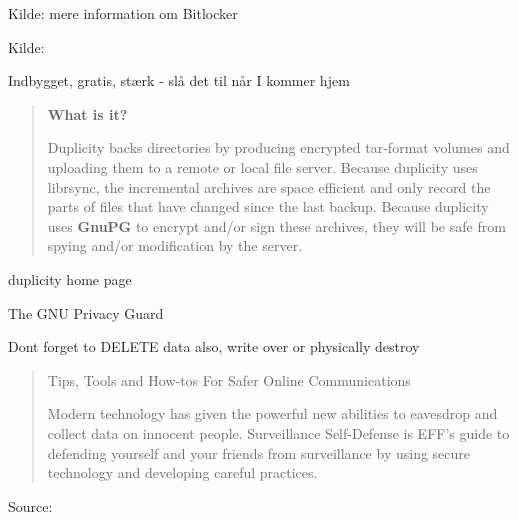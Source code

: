 \documentclass[18pt,landscape,a4paper,footrule]{foils}
\begin{document}
Kilde: mere information om Bitlocker\\
{\footnotesize {}}




Kilde: {\small
{}}



\centerline{Indbygget, gratis, stærk - slå det til når I kommer hjem}



\begin{quote}
{\large\bf What is it?}

Duplicity backs directories by producing encrypted tar-format volumes and uploading them to a remote or local file server. Because duplicity uses librsync, the incremental archives are space efficient and only record the parts of files that have changed since the last backup. Because duplicity uses {\bf GnuPG} to encrypt and/or sign these archives, they will be safe from spying and/or modification by the server.
\end{quote}

 duplicity home page

 The GNU Privacy Guard

\vskip 2cm
\centerline{Dont forget to DELETE data also, write over or physically destroy}



\begin{quote}
\centerline{Tips, Tools and How-tos For Safer Online Communications}

Modern technology has given the powerful new abilities to eavesdrop and collect data on innocent people. Surveillance Self-Defense is EFF's guide to defending yourself and your friends from surveillance by using secure technology and developing careful practices.
\end{quote}

Source: 


\end{document}
